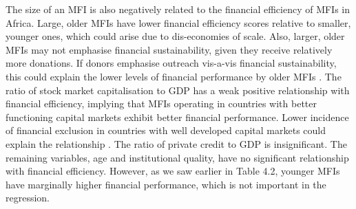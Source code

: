 \documentclass[a4paper, nobind]{templates/ociamthesis}
\begin{document}
The size of an MFI is also negatively related to the financial efficiency of MFIs in Africa. Large, older MFIs have lower financial efficiency scores relative to smaller, younger ones, which could arise due to dis-economies of scale. Also, larger, older MFIs may not emphasise financial sustainability, given they receive relatively more donations. If donors emphasise outreach vis-a-vis financial sustainability, this could explain the lower levels of financial performance by older MFIs \autocite{d2013unsubsidized}. The ratio of stock market capitalisation to GDP has a weak positive relationship with financial efficiency, implying that MFIs operating in countries with better functioning capital markets exhibit better financial performance. Lower incidence of financial exclusion in countries with well developed capital markets could explain the relationship \autocite{allen2014african}. The ratio of private credit to GDP is insignificant. The remaining variables, age and institutional quality, have no significant relationship with financial efficiency. However, as we saw earlier in Table 4.2, younger MFIs have marginally higher financial performance, which is not important in the regression.

\newpage
\end{document}
